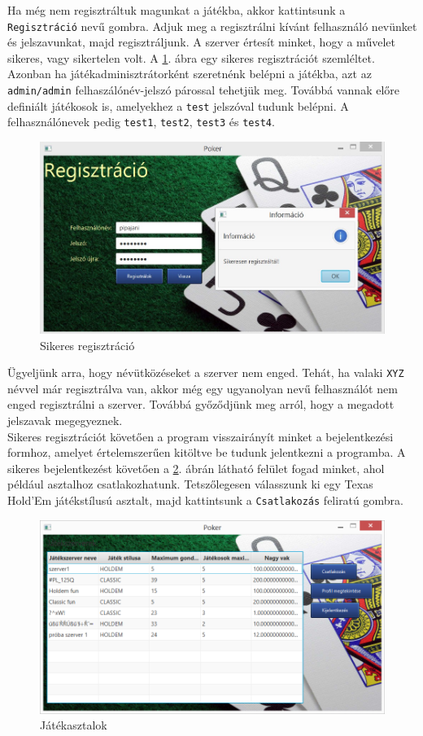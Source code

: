 Ha még nem regisztráltuk magunkat a játékba, akkor kattintsunk a \texttt{Regisztráció} nevű gombra. Adjuk meg a regisztrálni kívánt felhasználó nevünket és jelszavunkat, majd regisztráljunk. A szerver értesít minket, hogy a művelet sikeres, vagy sikertelen volt. A \ref{fig:reg_succ}. ábra egy sikeres regisztrációt szemléltet. Azonban ha játékadminisztrátorként szeretnénk belépni a játékba, azt az \texttt{admin/admin} felhaszálónév-jelszó párossal tehetjük meg. Továbbá vannak előre definiált játékosok is, amelyekhez a \texttt{test} jelszóval tudunk belépni. A felhasználónevek pedig \texttt{test1}, \texttt{test2}, \texttt{test3} és \texttt{test4}.
\begin{figure}[h!]
  \caption{Sikeres regisztráció}
  \label{fig:reg_succ}
  \centering
    \includegraphics[width=\linewidth]{user-documentation/images/succ_reg.jpg}
\end{figure}
Ügyeljünk arra, hogy névütközéseket a szerver nem enged. Tehát, ha valaki \texttt{XYZ} névvel már regisztrálva van, akkor még egy ugyanolyan nevű felhasználót nem enged regisztrálni a szerver. Továbbá győződjünk meg arról, hogy a megadott jelszavak megegyeznek.  \\
Sikeres regisztrációt követően a program visszairányít minket a bejelentkezési formhoz, amelyet értelemszerűen kitöltve be tudunk jelentkezni a programba.
A sikeres bejelentkezést követően a \ref{fig:poker_tables}. ábrán látható felület fogad minket, ahol például asztalhoz csatlakozhatunk. Tetszőlegesen válasszunk ki egy Texas Hold'Em játékstílusú asztalt, majd kattintsunk a \texttt{Csatlakozás} feliratú gombra.
\begin{figure}[h!]
  \caption{Játékasztalok}
  \label{fig:poker_tables}
  \centering
    \includegraphics[width=\linewidth]{user-documentation/images/tables.jpg}
\end{figure}

